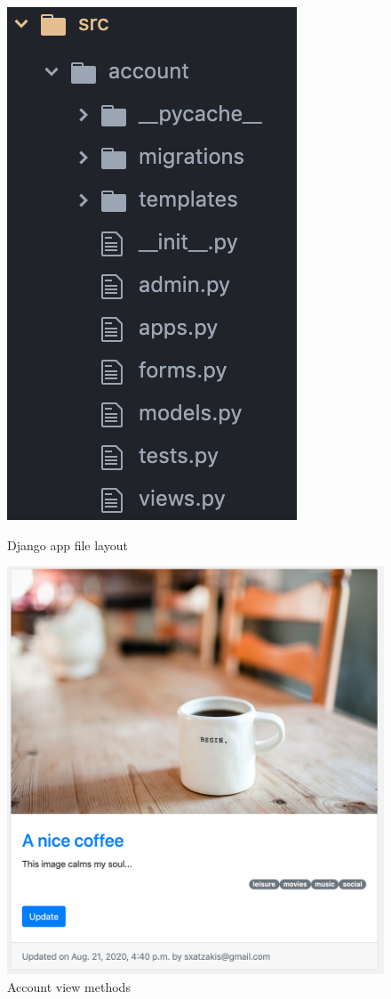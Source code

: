 \begin{figure}[htbp]
\begin{minipage}[t]{0.45\linewidth}
    \includegraphics[scale=0.5]{Figures/apps_django}
    \caption{Django app file layout}
    \label{apps_django}
\end{minipage}%
    \hfill%
\begin{minipage}[t]{0.45\linewidth}
    \includegraphics[width=\linewidth]{Figures/post_example}
    \caption{Account view methods}
    \label{account_view}
\end{minipage}
\end{figure}


